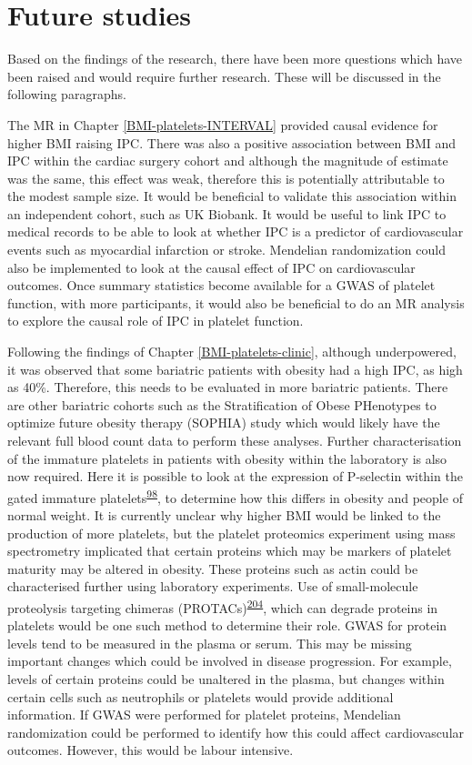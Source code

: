 \documentclass[11pt,twoside]{bristolthesis}
\begin{document}
\hypertarget{future-studies}{%
\section{Future studies}\label{future-studies}}

Based on the findings of the research, there have been more questions which have been raised and would require further research. These will be discussed in the following paragraphs.

The MR in Chapter \ref{BMI-platelets-INTERVAL} provided causal evidence for higher BMI raising IPC. There was also a positive association between BMI and IPC within the cardiac surgery cohort and although the magnitude of estimate was the same, this effect was weak, therefore this is potentially attributable to the modest sample size. It would be beneficial to validate this association within an independent cohort, such as UK Biobank. It would be useful to link IPC to medical records to be able to look at whether IPC is a predictor of cardiovascular events such as myocardial infarction or stroke. Mendelian randomization could also be implemented to look at the causal effect of IPC on cardiovascular outcomes. Once summary statistics become available for a GWAS of platelet function, with more participants, it would also be beneficial to do an MR analysis to explore the causal role of IPC in platelet function.

Following the findings of Chapter \ref{BMI-platelets-clinic}, although underpowered, it was observed that some bariatric patients with obesity had a high IPC, as high as 40\%. Therefore, this needs to be evaluated in more bariatric patients. There are other bariatric cohorts such as the Stratification of Obese PHenotypes to optimize future obesity therapy (SOPHIA) study which would likely have the relevant full blood count data to perform these analyses. Further characterisation of the immature platelets in patients with obesity within the laboratory is also now required. Here it is possible to look at the expression of P-selectin within the gated immature platelets\textsuperscript{\protect\hyperlink{ref-Bernlochner2015a}{98}}, to determine how this differs in obesity and people of normal weight. It is currently unclear why higher BMI would be linked to the production of more platelets, but the platelet proteomics experiment using mass spectrometry implicated that certain proteins which may be markers of platelet maturity may be altered in obesity. These proteins such as actin could be characterised further using laboratory experiments. Use of small-molecule proteolysis targeting chimeras (PROTACs)\textsuperscript{\protect\hyperlink{ref-Sledz2020}{204}}, which can degrade proteins in platelets would be one such method to determine their role. GWAS for protein levels tend to be measured in the plasma or serum. This may be missing important changes which could be involved in disease progression. For example, levels of certain proteins could be unaltered in the plasma, but changes within certain cells such as neutrophils or platelets would provide additional information. If GWAS were performed for platelet proteins, Mendelian randomization could be performed to identify how this could affect cardiovascular outcomes. However, this would be labour intensive.
\end{document}
